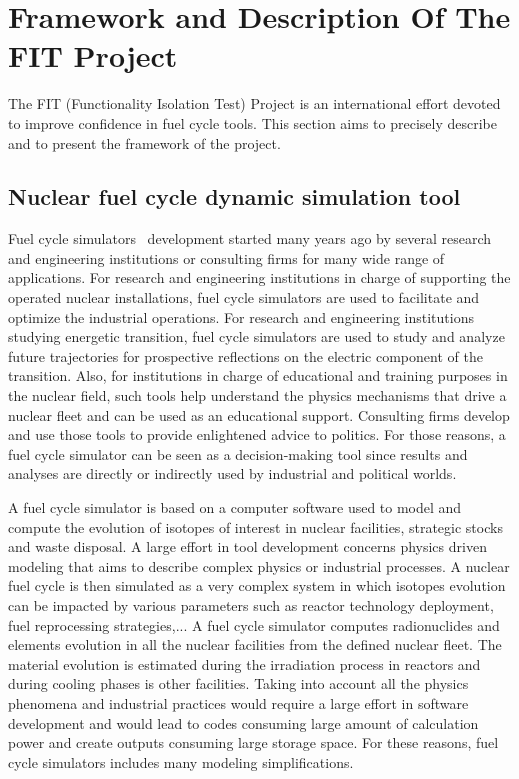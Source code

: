 \section{Framework and Description Of The FIT Project}
\label{sec:framework}
The FIT (Functionality Isolation Test) Project is an international effort devoted to improve confidence in fuel cycle tools.
This section aims to precisely describe and to present the framework of the project.

\subsection{Nuclear fuel cycle dynamic simulation tool}

Fuel cycle simulators~\cite{NEA2016} development started many years ago by several research and engineering institutions or consulting firms for many wide range of applications.
For research and engineering institutions in charge of supporting the operated nuclear installations, fuel cycle simulators are used to facilitate and optimize the industrial operations.
For research and engineering institutions studying energetic transition, fuel cycle simulators are used to study and analyze future trajectories for prospective reflections on the electric component of the transition.
Also, for institutions in charge of educational and training purposes in the nuclear field, such tools help understand the physics mechanisms that drive a nuclear fleet and can be used as an educational support.
Consulting firms develop and use those tools to provide enlightened advice to politics.
For those reasons, a fuel cycle simulator can be seen as a decision-making tool since results and analyses are directly or indirectly used by industrial and political worlds.

A fuel cycle simulator is based on a computer software used to model and compute the evolution of isotopes of interest in nuclear facilities, strategic stocks and waste disposal.
A large effort in tool development concerns physics driven modeling that aims to describe complex physics or industrial processes.
A nuclear fuel cycle is then simulated as a very complex system in which isotopes evolution can be impacted by various parameters such as reactor technology deployment, fuel reprocessing strategies,...
A fuel cycle simulator computes radionuclides and elements evolution in all the nuclear facilities from the defined nuclear fleet.
The material evolution is estimated during the irradiation process in reactors and during cooling phases is other facilities.
Taking into account all the physics phenomena and industrial practices would require a large effort in software development and would lead to codes consuming large amount of calculation power and create outputs consuming large storage space.
For these reasons, fuel cycle simulators includes many modeling simplifications.

